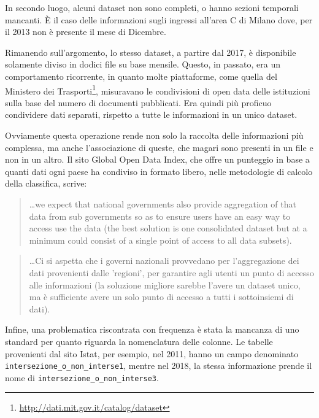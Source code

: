 \documentclass[a4paper]{report}
\newcommand{\columnstyle}[1]{\texttt{#1}}
\newcommand{\skipline}{\vspace{0.2in}}
\begin{document}
In secondo luogo, alcuni dataset non sono completi, o hanno sezioni temporali mancanti. 
\`E il caso delle informazioni sugli ingressi all'area C di Milano dove, 
per il 2013 non è presente il mese di Dicembre. 

Rimanendo sull'argomento, lo stesso dataset, a partire dal 2017, è disponibile 
solamente diviso in dodici file su base mensile. 
Questo, in passato, era un comportamento ricorrente, in 
quanto molte piattaforme, come quella del Ministero dei 
Trasporti\footnote{\url{http://dati.mit.gov.it/catalog/dataset}}, 
misuravano le condivisioni di open data delle istituzioni 
sulla base del numero di documenti pubblicati. 
Era quindi più proficuo condividere dati separati, rispetto a tutte le informazioni in 
un unico dataset. 

Ovviamente questa operazione rende non solo la raccolta delle informazioni più complessa, 
ma anche l'associazione di queste, che magari sono presenti in un file e non in un altro. 
Il sito Global Open Data Index, che offre un punteggio in base a quanti dati ogni paese 
ha condiviso in formato libero, nelle metodologie di calcolo della classifica, scrive: 


\begin{quotation}
    \dots we expect that national governments also provide aggregation 
    of that data from 
    sub governments so as to ensure users have an easy way to access use the data 
    (the best solution is one consolidated dataset but at a minimum could consist of a 
    single point of access to all data subsets).\cite{OPENDATAINDEX:1}
\end{quotation}

\begin{quotation}
    \dots Ci si aspetta che i governi nazionali provvedano per 
    l'aggregazione dei dati provenienti dalle 'regioni', per garantire agli utenti 
    un punto di accesso 
    alle informazioni (la soluzione migliore sarebbe l'avere un dataset unico, ma è sufficiente 
    avere un solo punto di accesso a tutti i sottoinsiemi di dati). 
\end{quotation}

\skipline
Infine, una problematica riscontrata con frequenza è stata la mancanza 
di uno standard per quanto riguarda la nomenclatura delle colonne. 
Le tabelle provenienti dal sito Istat, per esempio, nel 2011, hanno un campo denominato 
\columnstyle{intersezione\_o\_non\_interse1}, 
mentre nel 2018, la stessa informazione prende il nome di 
\columnstyle{intersezione\_o\_non\_interse3}.
\end{document}
